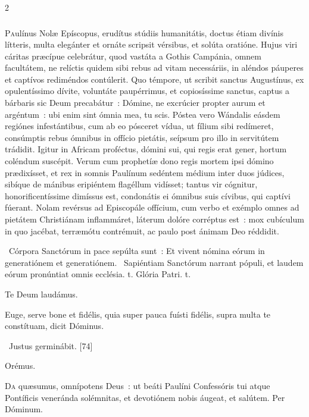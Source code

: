 \documentclass[9pt,twoside]{extarticle}
\begin{document}
\begin{multicols}{2}
{\subsubsection*{\center {}}
\lettrine{P}aulínus Nolæ Epíscopus, erudítus stúdiis humanitátis, doctus étiam divínis lítteris, multa elegánter et ornáte scripsit vérsibus, et solúta oratióne. Hujus viri cáritas præcípue celebrátur, quod vastáta a Gothis Campánia, omnem facultátem, ne relíctis quidem sibi rebus ad vitam necessáriis, in aléndos páuperes et captívos rediméndos contúlerit. Quo témpore, ut scribit sanctus Augustínus, ex opulentíssimo dívite, voluntáte paupérrimus, et copiosíssime sanctus, captus a bárbaris sic Deum precabátur~: Dómine, ne excrúcier propter aurum et argéntum~: ubi enim sint ómnia mea, tu scis. Póstea vero Wándalis eásdem regiónes infestántibus, cum ab eo pósceret vídua, ut fílium sibi redímeret, consúmptis rebus ómnibus in offício pietátis, seípsum pro illo in servitútem trádidit. Igitur in Africam proféctus, dómini sui, qui regis erat gener, hortum coléndum suscépit. Verum cum prophetíæ dono regis mortem ipsi dómino prædixísset, et rex in somnis Paulínum sedéntem médium inter duos júdices, sibíque de mánibus eripiéntem flagéllum vidísset; tantus vir cógnitur, honorificentíssime dimíssus est, condonátis ei ómnibus suis cívibus, qui captívi fúerant. Nolam revérsus ad Episcopále offícium, cum verbo et exémplo omnes ad pietátem Christiánam inflammáret, láterum dolóre corréptus est~: mox cubículum in quo jacébat, terræmótu contrémuit, ac paulo post ánimam Deo réddidit.

\begin{tightlist}{}
\item {}~Córpora Sanctórum in pace sepúlta sunt~: \textred{*} Et vivent nómina eórum in generatiónem et generatiónem.
~Sapiéntiam Sanctórum narrant pópuli, et laudem eórum pronúntiat omnis ecclésia. t. Glória Patri. t.
\item Te Deum laudámus.
\item {} Euge, serve bone et fidélis, quia super pauca fuísti fidélis, supra multa te constítuam, dicit Dóminus.
\item {}~Justus germinábit. [74]
\item Orémus. \hfill {}
\end{tightlist}
\lettrine{D}a quæsumus, omnípotens Deus~: ut beáti Paulíni Confessóris tui atque Pontíficis veneránda solémnitas, et devotiónem nobis áugeat, et salútem. Per Dóminum.

}
\end{multicols}
\end{document}
